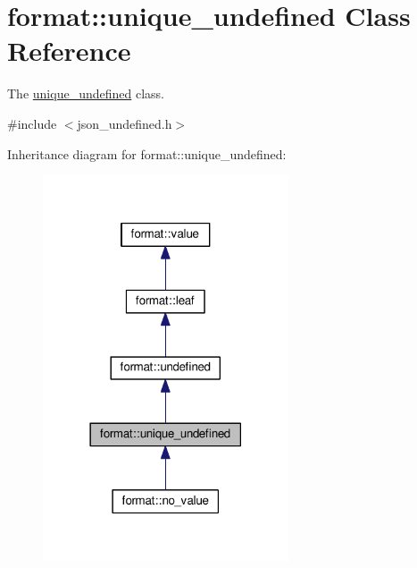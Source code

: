 \hypertarget{classformat_1_1unique__undefined}{}\section{format\+:\+:unique\+\_\+undefined Class Reference}
\label{classformat_1_1unique__undefined}


The \hyperlink{classformat_1_1unique__undefined}{unique\+\_\+undefined} class.  




{\ttfamily \#include $<$json\+\_\+undefined.\+h$>$}



Inheritance diagram for format\+:\+:unique\+\_\+undefined\+:
\nopagebreak
\begin{figure}[H]
\begin{center}
\leavevmode
\includegraphics[width=206pt]{classformat_1_1unique__undefined__inherit__graph}
\end{center}
\end{figure}


